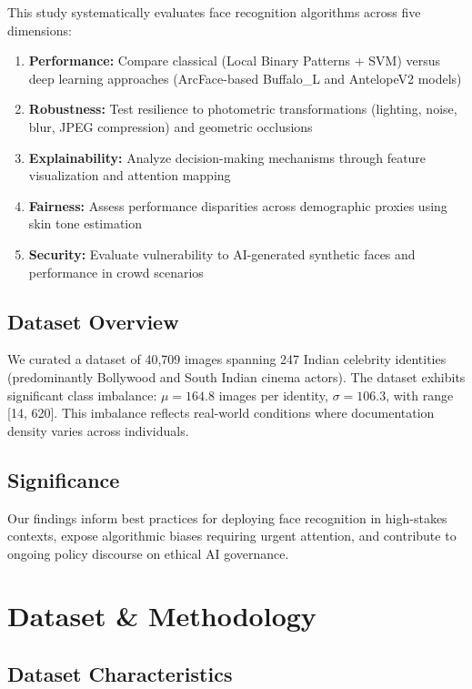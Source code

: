 \documentclass[11pt,a4paper]{article}
\begin{document}
This study systematically evaluates face recognition algorithms across five dimensions:

\begin{enumerate}
    \item \textbf{Performance:} Compare classical (Local Binary Patterns + SVM) versus deep learning approaches (ArcFace-based Buffalo\_L and AntelopeV2 models)
    \item \textbf{Robustness:} Test resilience to photometric transformations (lighting, noise, blur, JPEG compression) and geometric occlusions
    \item \textbf{Explainability:} Analyze decision-making mechanisms through feature visualization and attention mapping
    \item \textbf{Fairness:} Assess performance disparities across demographic proxies using skin tone estimation
    \item \textbf{Security:} Evaluate vulnerability to AI-generated synthetic faces and performance in crowd scenarios
\end{enumerate}

\subsection{Dataset Overview}

We curated a dataset of 40,709 images spanning 247 Indian celebrity identities (predominantly Bollywood and South Indian cinema actors). The dataset exhibits significant class imbalance: $\mu=164.8$ images per identity, $\sigma=106.3$, with range [14, 620]. This imbalance reflects real-world conditions where documentation density varies across individuals.

\subsection{Significance}

Our findings inform best practices for deploying face recognition in high-stakes contexts, expose algorithmic biases requiring urgent attention, and contribute to ongoing policy discourse on ethical AI governance.

\section{Dataset \& Methodology}

\subsection{Dataset Characteristics}
\end{document}
